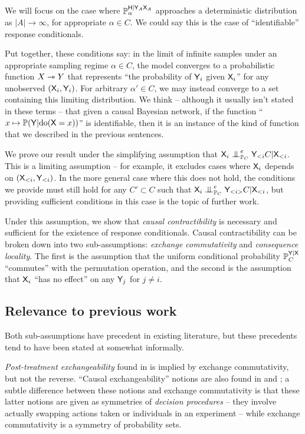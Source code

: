 We will focus on the case where $\mathbb{P}_\alpha^{\mathsf{H}|\mathsf{Y}_A\mathsf{X}_A}$ approaches a deterministic distribution as $|A|\to \infty$, for appropriate $\alpha\in C$. We could say this is the case of ``identifiable'' response conditionals.

Put together, these conditions say: in the limit of infinite samples under an appropriate sampling regime $\alpha\in C$, the model converges to a probabilistic function $X\rightarrowtriangle Y$ that represents ``the probability of $\mathsf{Y}_i$ given $\mathsf{X}_i$'' for any unobserved $(\mathsf{X}_i,\mathsf{Y}_i)$. For arbitrary $\alpha'\in C$, we may instead converge to a set containing this limiting distribution. We think -- although it usually isn't stated in these terms -- that given a causal Bayesian network, if the function ``$x\mapsto \mathbb{P}(\mathsf{Y}|\mathrm{do}(\mathsf{X}=x))$'' is identifiable, then it is an instance of the kind of function that we described in the previous sentences.

We prove our result under the simplifying assumption that $\RV{X}_i\CI_{\prob{P}_C}^e \RV{Y}_{<i} C|\RV{X}_{<i}$. This is a limiting assumption -- for example, it excludes cases where $\mathsf{X}_i$ depends on $(\mathsf{X}_{<i},\mathsf{Y}_{<i})$. In the more general case where this does not hold, the conditions we provide must still hold for any $C'\subset C$ such that $\RV{X}_i\CI_{\prob{P}_C}^e \RV{Y}_{<i>} C|\RV{X}_{<i}$, but providing sufficient conditions in this case is the topic of further work.

Under this assumption, we show that \emph{causal contractibility} is necessary and sufficient for the existence of response conditionals. Causal contractibility can be broken down into two sub-assumptions: \emph{exchange commutativity} and \emph{consequence locality}. The first is the assumption that the uniform conditional probability $\mathbb{P}_C^{\mathsf{Y}|\mathsf{X}}$ ``commutes'' with the permutation operation, and the second is the assumption that $\mathsf{X}_i$ ``has no effect'' on any $\mathsf{Y}_j$ for $j\neq i$.

\subsection{Relevance to previous work}

Both sub-assumptions have precedent in existing literature, but these precedents tend to have been stated at somewhat informally.

\emph{Post-treatment exchangeability} found in \citet{dawid_decision-theoretic_2020} is implied by exchange commutativity, but not the reverse. ``Causal exchangeability'' notions are also found in \citet{greenland_identifiability_1986} and \citet{banerjee_chapter_2017}; a subtle difference between these notions and exchange commutativity is that these latter notions are given as symmetries of \emph{decision procedures} -- they involve actually swapping actions taken or individuals in an experiment -- while exchange commutativity is a symmetry of probability sets.

